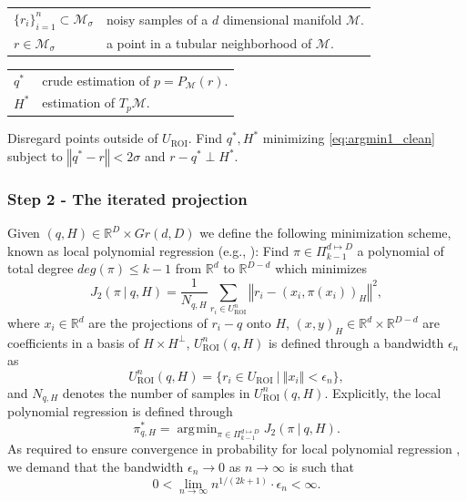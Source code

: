\documentclass[12pt]{article}
\theoremstyle{remark}
\newcommand{\RR}{\mathbb{R}}
\newcommand{\MM}{\mathcal{M}}
\newcommand{\norm}[1]{\left\Vert #1 \right\Vert}
\DeclareMathOperator*{\argmin}{\arg\!\min}
\begin{document}
\begin{algorithm}[H]
	\caption{Step 1: Find an initial coordinate system}
	\label{alg:alg1_clean}
	\begin{algorithmic}[1]
		\begin{tabular}[t]{ll}
			$\{r_i\}_{i=1}^n\subset \MM_\sigma$ & noisy samples of a $d$ dimensional manifold $ \MM $.\\
			$r\in \MM_\sigma$ & a point in a tubular neighborhood of $\MM$.
			\end{tabular}
		\begin{tabular}[t]{ll}
				$q^*$ & crude estimation of $p = P_\MM(r)$.\\
				$H^*$ & estimation of $T_p\MM$.\\
		\end{tabular}
		\State Disregard points outside of $U_{\textrm{ROI}}$.
		\State Find $q^*, H^*$ minimizing \eqref{eq:argmin1_clean} subject to $\norm{q^* - r}<2\sigma$ and $r - q^* \perp H^*$. 
	\end{algorithmic}
\end{algorithm}


\subsubsection{Step 2 - The iterated projection}
Given $(q, H)\in \RR^D\times Gr(d,D)$ we define the following minimization scheme, known as local polynomial regression (e.g., \cite{cleveland1979robust,mclain1976two}):
Find $\pi\in \Pi_{k-1}^{d\mapsto D}$ a polynomial of total degree $deg(\pi)\leq k-1$ from $\RR^d$ to $\RR^{D-d}$ which minimizes
\begin{equation}\label{eq:Step2_clean}
    J_2(\pi ~|~ q, H) = \frac{1}{N_{q, H}}\sum_{r_i \in U_{\textrm{ROI}}^n} \norm{r_i - (x_i, \pi(x_i))_H}^2
,\end{equation}
where $x_i\in \RR^d$ are the projections of $r_i - q$ onto $H$, $(x, y)_H\in \RR^d\times\RR^{D-d}$ are coefficients in a basis of $H\times H^\perp$, $U_{\textrm{ROI}}^n(q,H)$ is defined through a bandwidth $\epsilon_n$ as
\begin{equation}\label{eq:ROI_ell_clean}
    U_{\textrm{ROI}}^n(q,H) = {\{r_i\in U_\textrm{ROI}~|~\norm{x_i}<\epsilon_n\}}
,\end{equation}
and $N_{q, H}$ denotes the number of samples in $U_{\textrm{ROI}}^n(q, H)$.
Explicitly, the local polynomial regression is defined through
\begin{equation}\label{eq:argmin2_clean}
    \pi^*_{q, H} = \argmin_{\pi\in \Pi_{k-1}^{d\mapsto D}} J_2(\pi ~|~ q, H)
.\end{equation}
As required to ensure convergence in probability for local polynomial regression \cite{aizenbud2021VectorEstimation,stone1980optimal}, we demand that the bandwidth $\epsilon_n\to 0$ as $n\to\infty$ is such that 
\begin{equation}\label{eq:bandwidthDecay_clean}
    0<\lim_{n\rightarrow\infty}n^{1/(2k+1)}\cdot \epsilon_n < \infty
.\end{equation}
\end{document}
